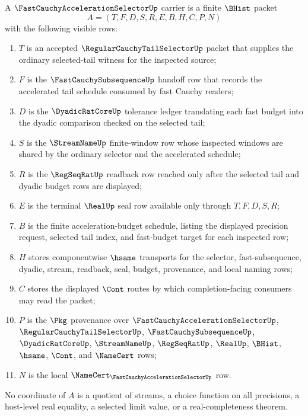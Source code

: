 \begin{definition}
\label{def:fast-cauchy-acceleration-selector-carrier}
A $\FastCauchyAccelerationSelectorUp$ carrier is a finite $\BHist$ packet
$$
A=(T,F,D,S,R,E,B,H,C,P,N)
$$
with the following visible rows:
\begin{enumerate}
\item $T$ is an accepted $\RegularCauchyTailSelectorUp$ packet that supplies the ordinary selected-tail witness for the inspected source;
\item $F$ is the $\FastCauchySubsequenceUp$ handoff row that records the accelerated tail schedule consumed by fast Cauchy readers;
\item $D$ is the $\DyadicRatCoreUp$ tolerance ledger translating each fast budget into the dyadic comparison checked on the selected tail;
\item $S$ is the $\StreamNameUp$ finite-window row whose inspected windows are shared by the ordinary selector and the accelerated schedule;
\item $R$ is the $\RegSeqRatUp$ readback row reached only after the selected tail and dyadic budget rows are displayed;
\item $E$ is the terminal $\RealUp$ seal row available only through $T,F,D,S,R$;
\item $B$ is the finite acceleration-budget schedule, listing the displayed precision request, selected tail index, and fast-budget target for each inspected row;
\item $H$ stores componentwise $\hsame$ transports for the selector, fast-subsequence, dyadic, stream, readback, seal, budget, provenance, and local naming rows;
\item $C$ stores the displayed $\Cont$ routes by which completion-facing consumers may read the packet;
\item $P$ is the $\Pkg$ provenance over $\FastCauchyAccelerationSelectorUp$, $\RegularCauchyTailSelectorUp$, $\FastCauchySubsequenceUp$, $\DyadicRatCoreUp$, $\StreamNameUp$, $\RegSeqRatUp$, $\RealUp$, $\BHist$, $\hsame$, $\Cont$, and $\NameCert$ rows;
\item $N$ is the local $\NameCert_{\FastCauchyAccelerationSelectorUp}$ row.
\end{enumerate}
No coordinate of $A$ is a quotient of streams, a choice function on all precisions, a host-level real equality, a selected limit value, or a real-completeness theorem.
\end{definition}

